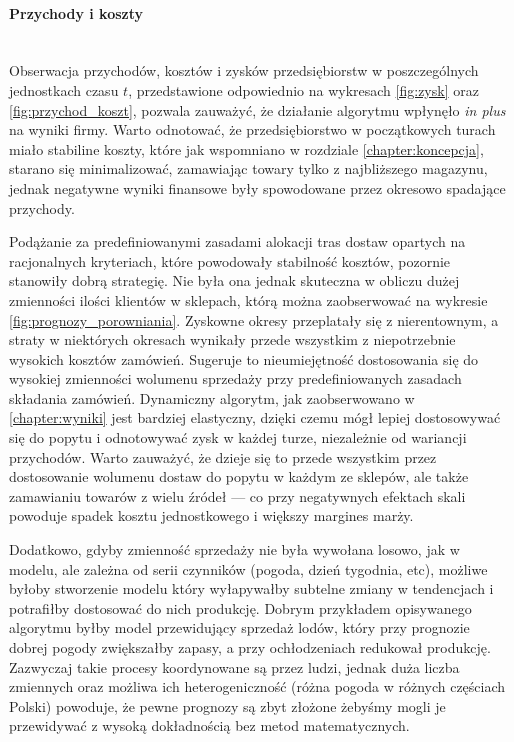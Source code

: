 \documentclass[polish, twoside, 12pt, a4paper]{article}
\theoremstyle{definition}
\theoremstyle{plain}
\theoremstyle{remark}
\begin{document}
\paragraph{Przychody i koszty} \mbox{}\\

Obserwacja przychodów, kosztów i zysków przedsiębiorstw w poszczególnych jednostkach czasu $t$, przedstawione odpowiednio na wykresach \ref{fig:zysk} oraz \ref{fig:przychod_koszt}, pozwala zauważyć, że działanie algorytmu wpłynęło \textit{in plus} na wyniki firmy. Warto odnotować, że przedsiębiorstwo w początkowych turach miało stabiline koszty, które jak wspomniano w rozdziale \ref{chapter:koncepcja}, starano się minimalizować, zamawiając towary tylko z najbliższego magazynu, jednak negatywne wyniki finansowe były spowodowane przez okresowo spadające przychody. 

Podążanie za predefiniowanymi zasadami alokacji tras dostaw opartych na racjonalnych kryteriach, które powodowały stabilność kosztów, pozornie stanowiły dobrą strategię. Nie była ona jednak skuteczna w obliczu dużej zmienności ilości klientów w sklepach, którą można zaobserwować na wykresie \ref{fig:prognozy_porowniania}. Zyskowne okresy przeplatały się z nierentownym, a straty w niektórych okresach wynikały przede wszystkim z niepotrzebnie wysokich kosztów zamówień. Sugeruje to nieumiejętność dostosowania się do wysokiej zmienności wolumenu sprzedaży przy predefiniowanych zasadach składania zamówień. Dynamiczny algorytm, jak zaobserwowano w \ref{chapter:wyniki} jest bardziej elastyczny, dzięki czemu mógł lepiej dostosowywać się do popytu i odnotowywać zysk w każdej turze, niezależnie od wariancji przychodów. Warto zauważyć, że dzieje się to przede wszystkim przez dostosowanie wolumenu dostaw do popytu w każdym ze sklepów, ale także zamawianiu towarów z wielu źródeł --- co przy negatywnych efektach skali powoduje spadek kosztu jednostkowego i większy margines marży.

Dodatkowo, gdyby zmienność sprzedaży nie była wywołana losowo, jak w modelu, ale zależna od serii czynników (pogoda, dzień tygodnia, etc), możliwe byłoby stworzenie modelu który wyłapywałby subtelne zmiany w tendencjach i potrafiłby dostosować do nich produkcję. Dobrym przykładem opisywanego algorytmu byłby model przewidujący sprzedaż lodów, który przy prognozie dobrej pogody zwiększałby zapasy, a przy ochłodzeniach redukował produkcję. Zazwyczaj takie procesy koordynowane są przez ludzi, jednak duża liczba zmiennych oraz możliwa ich heterogeniczność (różna pogoda w różnych częściach Polski) powoduje, że pewne prognozy są zbyt złożone żebyśmy mogli je przewidywać z wysoką dokładnością bez metod matematycznych. 
\end{document}
